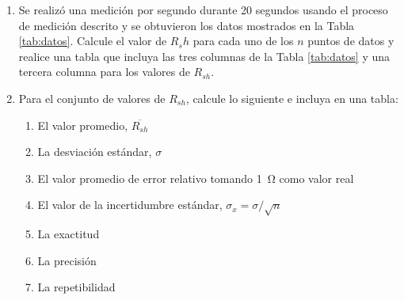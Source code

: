 \documentclass[12pt]{article}
\begin{document}
\begin{enumerate}
    \item Se realizó una medición por segundo durante 20 segundos usando el proceso de medición descrito y se obtuvieron los datos mostrados en la Tabla \ref{tab:datos}. Calcule el valor de $R_sh$ para cada uno de los $n$ puntos de datos y realice una tabla que incluya las tres columnas de la Tabla \ref{tab:datos} y una tercera columna para los valores de $R_{sh}$.
    \item Para el conjunto de valores de $R_{sh}$, calcule lo siguiente e incluya en una tabla:
    \begin{enumerate}
        \item El valor promedio, $\overline{R_{sh}}$ 
        \item La desviación estándar, $\sigma$
        \item El valor promedio de error relativo tomando \SI{1}{\ohm} como valor real
        \item El valor de la incertidumbre estándar, $\sigma_x = \sigma / \sqrt{n}$
        \item La exactitud
        \item La precisión
        \item La repetibilidad
    \end{enumerate}

\end{enumerate}




% 
% 
\end{document}

